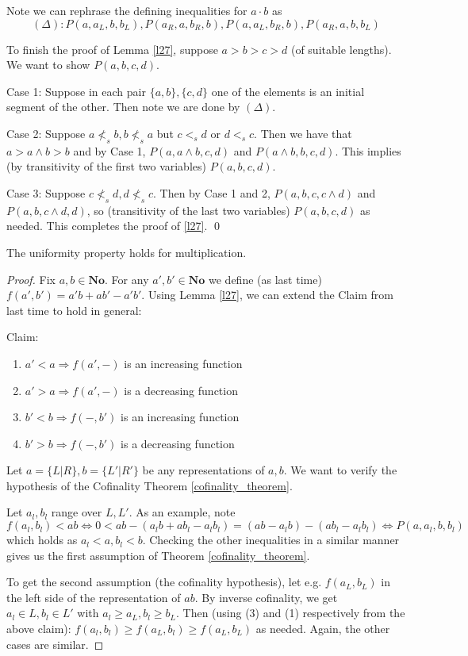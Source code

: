 Note we can rephrase the defining inequalities for $a\cdot b$ as
\[
(\Delta): P(a,a_L,b,b_L), P(a_R,a,b_R,b), P(a,a_L,b_R,b), P(a_R,a,b,b_L)
\]

To finish the proof of Lemma \ref{l27}, suppose $a>b>c>d$ (of suitable lengths). We want to show $P(a,b,c,d)$.

Case 1:  Suppose in each pair $\{a,b\}, \{c,d\}$ one of the elements is an initial segment of the other. Then note we are done by $(\Delta)$.

Case 2:  Suppose $a \not<_s b, b\not<_s a$ but $c <_s d$ or $d <_s c$. Then we have that $a > a\wedge b > b$ and by Case 1, $P(a,a\wedge b, c, d)$ and $P(a\wedge b, b, c, d)$. This implies (by transitivity of the first two variables) $P(a,b,c,d)$.

Case 3:  Suppose $c \not<_s d, d\not<_s c$. Then by Case 1 and 2, $P(a,b,c,c\wedge d)$ and $P(a,b,c\wedge d, d)$, so (transitivity of the last two variables) $P(a,b,c,d)$ as needed. This completes the proof of \eqref{l27}. \qed

\begin{lemma} %
The uniformity property holds for multiplication.
 \end{lemma}

\begin{proof}
Fix $a,b\in \mathbf{No}$. For any $a',b'\in \mathbf{No}$ we define (as last time) $f(a',b') = a'b + ab' - a'b'$. Using Lemma \ref{l27}, we can extend the Claim from last time to hold in general:

Claim:
\begin{enumerate}
\item $a' < a \Rightarrow f(a',-)$ is an increasing function
\item $a' > a \Rightarrow f(a',-)$ is a decreasing function
\item $b' < b \Rightarrow f(-,b')$ is an increasing function
\item $b' > b \Rightarrow f(-,b')$ is a decreasing function
\end{enumerate}

Let $a = \{L|R\}, b = \{L'|R'\}$ be any representations of $a,b$. We want to verify the hypothesis of the Cofinality Theorem \ref{cofinality_theorem}.

Let $a_l, b_l$ range over $L,L'$. As an example, note
\[
f(a_l, b_l) < ab \Leftrightarrow 0 < ab - (a_lb + ab_l - a_lb_l) = (ab - a_lb) - (ab_l - a_lb_l)
\Leftrightarrow P(a,a_l,b,b_l)
\]
which holds as $a_l<a, b_l<b$. Checking the other inequalities in a similar manner gives us the first assumption of Theorem \ref{cofinality_theorem}.

To get the second assumption (the cofinality hypothesis), let e.g. $f(a_L,b_L)$ in the left side of the representation of $ab$. By inverse cofinality, we get $a_l\in L, b_l\in L'$ with $a_l \geq a_L, b_l\geq b_L$.
Then (using (3) and (1) respectively from the above claim): $f(a_l,b_l) \geq f(a_L,b_l)\geq f(a_L,b_L)$ as needed. Again, the other cases are similar.
\end{proof}

